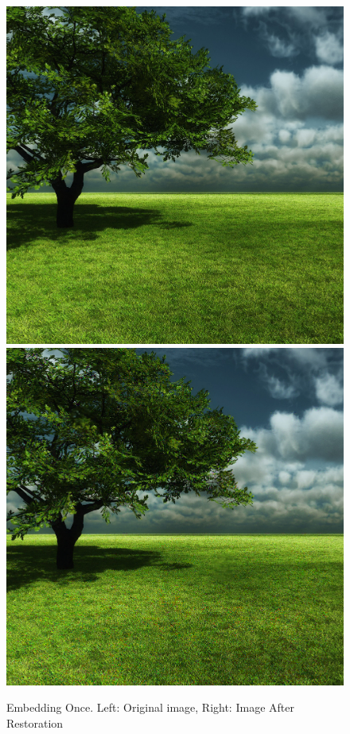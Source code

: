 \documentclass[12pt]{article}
\begin{document}
\begin{figure}[h]
\centerline{%
\includegraphics[scale=0.3375]{"tree"}%
\hspace{0.1cm}
\includegraphics[scale=0.45]{"Tree Embed once 0.8 threshold/finalImageAfterRestoration"}%
}%
\caption{Embedding Once. Left: Original image, Right: Image After Restoration}
\label{fig:treeEmbedOnceRestore}
\end{figure}
\end{document}
